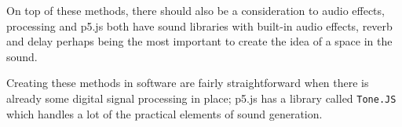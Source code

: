 On top of these methods, there should also be a consideration to audio effects,
processing and p5.js both have sound libraries with built-in audio effects,
reverb and delay perhaps being the most important to create the idea of a space
in the sound.

Creating these methods in software are fairly straightforward when there is
already some digital signal processing in place; p5.js has a library called
\verb|Tone.JS| which handles a lot of the practical elements of sound
generation.
